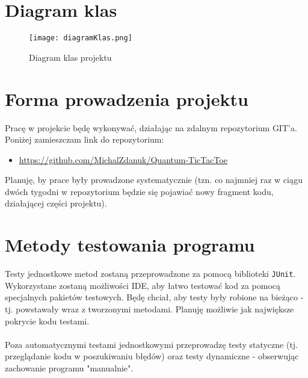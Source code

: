 \documentclass{article}
\begin{document}
\newpage

\section{Diagram klas}

\begin{figure}[h]
    \centering
    \texttt{[image: diagramKlas.png]}
    \caption{Diagram klas projektu}
\end{figure}

\newpage

\section{Forma prowadzenia projektu}
Pracę w projekcie będę wykonywać, działając na zdalnym repozytorium GIT'a. Poniżej zamieszczam link do repozytorium:
\begin{itemize}
    \item \url{https://github.com/MichalZdanuk/Quantum-TicTacToe}
\end{itemize}
Planuję, by prace były prowadzone systematycznie (tzn. co najmniej raz w ciągu dwóch tygodni w repozytorium będzie się pojawiać nowy fragment kodu, działającej części projektu).

\section{Metody testowania programu}
Testy jednostkowe metod zostaną przeprowadzone za pomocą biblioteki \texttt{JUnit}. Wykorzystane zostaną możliwości IDE, aby łatwo testować kod za pomocą specjalnych pakietów testowych. Będę chciał, aby testy były robione na bieżąco - tj. powstawały wraz z tworzonymi metodami. Planuję możliwie jak największe pokrycie kodu testami.\\ \\
Poza automatycznymi testami jednostkowymi przeprowadzę testy statyczne (tj. przeglądanie kodu w poszukiwaniu błędów) oraz testy dynamiczne - obserwując zachowanie programu "manualnie".
\end{document}
